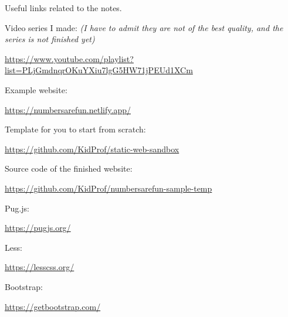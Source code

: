 Useful links related to the notes.
\vspace{6mm}

Video series I made: \textit{(I have to admit they are not of the best quality, and the series is not finished yet)}

\url{https://www.youtube.com/playlist?list=PLjGmdnqrOKuYXiu7lgG5HW71jPEUd1XCm}
\vspace{6mm}

Example website:

\url{https://numbersarefun.netlify.app/}
\vspace{6mm}

Template for you to start from scratch:

\url{https://github.com/KidProf/static-web-sandbox}
\vspace{6mm}

Source code of the finished website:

\url{https://github.com/KidProf/numbersarefun-sample-temp}
\vspace{6mm}

Pug.js: 

\url{https://pugjs.org/}
\vspace{6mm}

Less: 

\url{https://lesscss.org/}
\vspace{6mm}

Bootstrap: 

\url{https://getbootstrap.com/}
\vspace{6mm}
